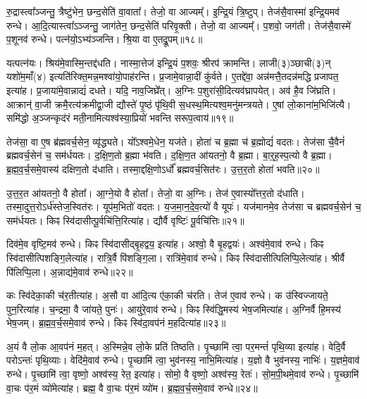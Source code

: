 रु॒द्रास्त्वा᳚ञ्जन्तु॒ त्रैष्टु॑भेन॒ छन्द॒सेति॑ वा॒वाता᳚।
तेजो॒ वा आज्यम्᳚।
इ॒न्द्रि॒यं त्रि॒ष्टुप्।
तेज॑सै॒वास्मा॑ इन्द्रि॒यमव॑ रुन्धे।
आ॒दि॒त्यास्त्वा᳚\-ऽञ्जन्तु॒ जाग॑तेन॒ छन्द॒सेति॑ परिवृ॒क्ती।
तेजो॒ वा आज्यम्᳚।
प॒शवो॒ जग॑ती।
तेज॑सै॒वास्मे॑ प॒शूनव॑ रुन्धे।
पत्न॑यो॒\-ऽभ्य॑ञ्जन्ति।
श्रि॒या वा ए॒तद्रू॒पम्॥१८॥\ip

यत्पत्न॑यः।
श्रिय॑मे॒वास्मि॒न्तद्द॑धति।
नास्मा॒त्तेज॑ इन्द्रि॒यं प॒शवः॒ श्रीरप॑ क्रामन्ति।
लाजी(३)ञ्छाची(३)न् यशो॑म॒माँ(४) इत्यति॑रिक्त॒मन्न॒मश्वा॑यो॒पाह॑रन्ति।
प्र॒जामे॒वान्ना॒दीं कु॑र्वते।
ए॒तद्दे॑वा॒ अन्न॑मत्तै॒तदन्न॑मद्धि प्रजापत॒ इत्या॑ह।
प्र॒जाया॑मे॒वान्नाद्यं॑ दधते।
यदि॒ नाव॒जिघ्रे᳚त्।
अ॒ग्निः प॒शुरा॑सी॒दित्यव॑घ्रापयेत्।
अव॑ है॒व जि॑घ्रति।
आक्रान्॑ वा॒जी क्रमै॒रत्य॑क्रमीद्वा॒जी द्यौस्ते॑ पृ॒ष्ठं पृ॑थि॒वी स॒धस्थ॒मित्यश्व॒मनु॑मन्त्रयते।
ए॒षां लो॒काना॑म॒भिजि॑त्यै।
समि॑द्धो अ॒ञ्जन्कृद॑रं मती॒नामित्यश्व॑स्या॒प्रियो॑ भवन्ति सरूप॒त्वाय॑॥१९॥\ip\anuvakamend[परि॑त॒स्थुष॒ इत्या॑हे॒मे ए॒वास्मै॑ युनक्त्य॒भिजि॑त्यै भरन्त्यश्वमे॒धो रु॑न्धे रू॒पञ्जि॑घ्रति॒ त्रीणि॑ च]

तेज॑सा॒ वा ए॒ष ब्र॑ह्म\-वर्च॒सेन॒ व्यृ॑द्ध्यते।
यो᳚ऽश्वमे॒धेन॒ यज॑ते।
होता॑ च ब्र॒ह्मा च॑ ब्र॒ह्मोद्यं॑ वदतः।
तेज॑सा चै॒वैनं॑ ब्रह्मवर्च॒सेन॑ च॒ सम॑र्धयतः।
द॒क्षि॒ण॒तो ब्र॒ह्मा भ॑वति।
द॒क्षि॒ण॒त आ॑यतनो॒ वै ब्र॒ह्मा।
बा॒र्॒ह॒स्प॒त्यो वै ब्र॒ह्मा।
ब्र॒ह्म॒व॒र्च॒समे॒वास्य॑ दक्षिण॒तो द॑धाति।
तस्मा॒द्दक्षि॒णो\-ऽर्धो᳚ ब्रह्मवर्च॒सित॑रः।
उ॒त्त॒र॒तो होता॑ भवति॥२०॥\ip

उ॒त्त॒र॒त आ॑यतनो॒ वै होता᳚।
आ॒ग्ने॒यो वै होता᳚।
तेजो॒ वा अ॒ग्निः।
तेज॑ ए॒वास्यो᳚त्तर॒तो द॑धाति।
तस्मा॒दुत्त॒रो\-ऽर्ध॑स्तेज॒स्वित॑रः।
यूप॑म॒भितो॑ वदतः।
य॒ज॒मा॒न॒दे॒व॒त्यो॑ वै यूपः॑।
यज॑मानमे॒व तेज॑सा च ब्रह्मवर्च॒सेन॑ च॒ सम॑र्धयतः।
किꣴ स्वि॑दासीत्पू॒र्वचि॑त्ति॒रित्या॑ह।
द्यौर्वै वृष्टिः॑ पू॒र्वचि॑त्तिः॥२१॥\ip

दिव॑मे॒व वृष्टि॒मव॑ रुन्धे।
किꣴ स्वि॑दासीद्बृ॒हद्वय॒ इत्या॑ह।
अश्वो॒ वै बृ॒हद्वयः॑।
अश्व॑मे॒वाव॑ रुन्धे।
किꣴ स्वि॑दासीत्पिशङ्गि॒लेत्या॑ह।
रात्रि॒र्वै पि॑शङ्गि॒ला।
रात्रि॑मे॒वाव॑ रुन्धे।
किꣴ स्वि॑दासीत्पिलिप्पि॒ले\-त्या॑ह।
श्रीर्वै पि॑लिप्पि॒ला।
अ॒न्नाद्य॑मे॒वाव॑ रुन्धे॥२२॥\ip

कः स्वि॑देका॒की च॑र॒तीत्या॑ह।
अ॒सौ वा आ॑दि॒त्य ए॑का॒की च॑रति।
तेज॑ ए॒वाव॑ रुन्धे।
क उ॑स्विज्जायते॒ पुन॒रित्या॑ह।
च॒न्द्रमा॒ वै जा॑यते॒ पुनः॑।
आयु॑रे॒वाव॑ रुन्धे।
किꣴ स्वि॑द्धि॒मस्य॑ भेष॒जमित्या॑ह।
अ॒ग्निर्वै हि॒मस्य॑ भेष॒जम्।
ब्र॒ह्म॒व॒र्च॒समे॒वाव॑ रुन्धे।
किꣴ स्वि॑दा॒वप॑नं म॒हदित्या॑ह॥२३॥\ip

अ॒यं वै लो॒क आ॒वप॑नं म॒हत्।
अ॒स्मिन्ने॒व लो॒के प्रति॑ तिष्ठति।
पृ॒च्छामि॑ त्वा॒ पर॒मन्तं॑ पृथि॒व्या इत्या॑ह।
वेदि॒र्वै परो\-ऽन्तः॑ पृथि॒व्याः।
वेदि॑मे॒वाव॑ रुन्धे।
पृ॒च्छामि॑ त्वा॒ भुव॑नस्य॒ नाभि॒मित्या॑ह।
य॒ज्ञो वै भुव॑नस्य॒ नाभिः॑।
य॒ज्ञमे॒वाव॑ रुन्धे।
पृ॒च्छामि॑ त्वा॒ वृष्णो॒ अश्व॑स्य॒ रेत॒ इत्या॑ह।
सोमो॒ वै वृष्णो॒ अश्व॑स्य॒ रेतः॑।
सो॒म॒पी॒थमे॒वाव॑ रुन्धे।
पृ॒च्छामि॑ वा॒चः प॑र॒मं व्यो॑मेत्या॑ह।
ब्रह्म॒ वै वा॒चः प॑र॒मं व्यो॑म।
ब्र॒ह्म॒व॒र्च॒समे॒वाव॑ रुन्धे॥२४॥\ip\anuvakamend[होता॑ भवति॒ वै वृष्टिः॑ पू॒र्वचि॑त्तिर॒न्नाद्य॑मे॒वाव॑ रुन्धे म॒हदित्या॑ह॒ सोमो॒ वै वृष्णो॒ अश्व॑स्य॒ रेत॑श्च॒त्वारि॑ च]


